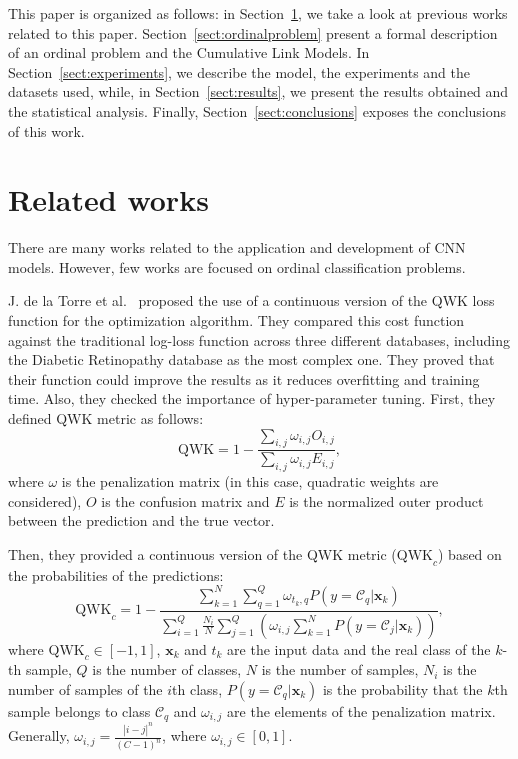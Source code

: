 \documentclass[journal]{IEEEtran}
\begin{document}
	This paper is organized as follows: in Section~\ref{sect:relatedwork}, we take a look at previous works related to this paper. Section~\ref{sect:ordinalproblem} present a formal description of an ordinal problem and the Cumulative Link Models. In Section~\ref{sect:experiments}, we describe the model, the experiments and the datasets used, while, in Section~\ref{sect:results}, we present the results obtained and the statistical analysis. Finally, Section~\ref{sect:conclusions} exposes the conclusions of this work.
	
	\section{Related works}
	\label{sect:relatedwork}
	There are many works related to the application and development of CNN models. However, few works are focused on ordinal classification problems.
	
	J. de la Torre et al.~\cite{de2018weighted} proposed the use of a continuous version of the QWK loss function for the optimization algorithm. They compared this cost function against the traditional log-loss function across three different databases, including the Diabetic Retinopathy database as the most complex one. They proved that their function could improve the results as it reduces overfitting and training time. Also, they checked the importance of hyper-parameter tuning. First, they defined QWK metric as follows:
	\begin{equation}
	\text{QWK} = 1 - \frac{\sum\limits_{i,j} \omega_{i,j} O_{i,j}}{\sum\limits_{i,j} \omega_{i,j} E_{i,j}},
	\end{equation}
	where $\omega$ is the penalization matrix (in this case, quadratic weights are considered), $O$ is the confusion matrix and $E$ is the normalized outer product between the prediction and the true vector.
	
	Then, they provided a continuous version of the QWK metric ($\text{QWK}_c$) based on the probabilities of the predictions:
	\begin{equation}
	\text{QWK}_c = 1 - \frac{\sum\limits_{k=1}^N \sum\limits_{q=1}^Q \omega_{t_k, q} P(y = \mathcal{C}_q | \mathbf{x}_k)}{\sum\limits_{i=1}^Q \frac{N_i}{N} \sum\limits_{j=1}^Q ( \omega_{i,j} \sum\limits_{k=1}^N P(y = \mathcal{C}_j | \mathbf{x}_k))},
	\end{equation}
	where $\text{QWK}_c \in [-1,1]$, $\mathbf{x}_k$ and $t_k$ are the input data and the real class of the $k$-th sample, $Q$ is the number of classes, $N$ is the number of samples, $N_i$ is the number of samples of the $i$th class, $P(y = \mathcal{C}_q | \mathbf{x}_k)$ is the probability that the $k$th sample belongs to class $\mathcal{C}_q$ and $\omega_{i,j}$ are the elements of the penalization matrix. Generally, $\omega_{i,j} = \frac{|i-j|^n}{(C-1)^n}$, where $\omega_{i,j} \in [0,1]$.
	
\end{document}
